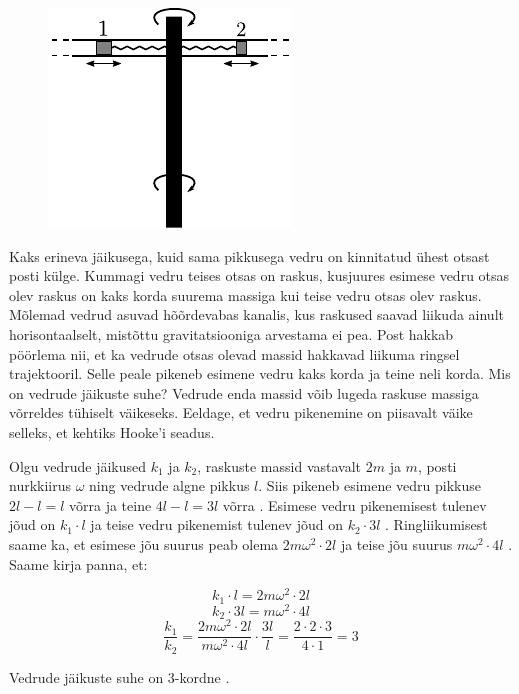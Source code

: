 
\begin{figure}
  \vspace{-2em}
  \begin{center}
    \includegraphics[width=1\linewidth]{2023-v2g-05-yl.pdf}
  \end{center}
  \vspace{-2em}
\end{figure}

Kaks erineva jäikusega, kuid sama pikkusega vedru on kinnitatud ühest otsast posti külge. Kummagi vedru teises otsas on raskus, kusjuures esimese vedru otsas olev raskus on kaks korda suurema massiga kui teise vedru otsas olev raskus. Mõlemad vedrud asuvad hõõrdevabas kanalis, kus raskused saavad liikuda ainult horisontaalselt, mistõttu gravitatsiooniga arvestama ei pea. Post hakkab pöörlema nii, et ka vedrude otsas olevad massid hakkavad liikuma ringsel trajektooril. Selle peale pikeneb esimene vedru kaks korda ja teine neli korda. Mis on vedrude jäikuste suhe? Vedrude enda massid võib lugeda raskuse massiga võrreldes tühiselt väikeseks. Eeldage, et vedru pikenemine on piisavalt väike selleks, et kehtiks Hooke'i seadus.


\hint

\solu
Olgu vedrude jäikused $k_1$ ja $k_2$, raskuste massid vastavalt $2m$ ja $m$, posti nurkkiirus $\omega$ ning vedrude algne pikkus $l$. Siis pikeneb esimene vedru pikkuse $2l - l = l$ võrra ja teine $4l - l = 3l$ võrra . Esimese vedru pikenemisest tulenev jõud on $k_1 \cdot l$ ja teise vedru pikenemist tulenev jõud on $k_2 \cdot 3l$ . Ringliikumisest saame ka, et esimese jõu suurus peab olema $2m \omega^2 \cdot 2l$ ja teise jõu suurus $m \omega^2 \cdot 4l$ . Saame kirja panna, et:

$$k_1 \cdot l = 2m \omega^2 \cdot 2l$$
$$k_2 \cdot 3l = m \omega^2 \cdot 4l$$
$$\frac{k_1}{k_2} = \frac{2m \omega^2 \cdot 2l}{m \omega^2 \cdot 4l} \cdot \frac{3l}{l} = \frac{2 \cdot 2 \cdot 3}{4 \cdot 1} = 3$$

Vedrude jäikuste suhe on 3-kordne .
\probend